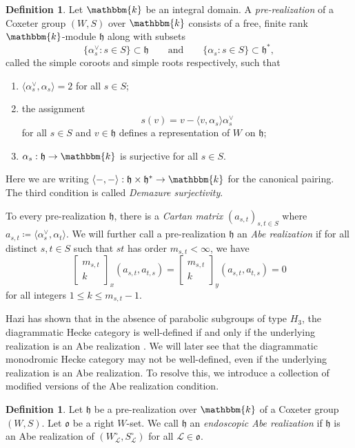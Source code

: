 \documentclass{amsart}
\renewcommand{\k}{\mathbbm{k}}
\newcommand{\scrL}{\mathcal{L}}
\newcommand{\fr}[1]{\mathfrak{#1}}
\renewcommand{\binom}[2]{\begin{bmatrix} #1 \\ #2 \end{bmatrix}}
\theoremstyle{definition}
\newtheorem{definition}[subsubsection]{Definition}
\numberwithin{equation}{subsection}
\begin{document}
\begin{definition}\label{def:realization}
    Let $\k$ be an integral domain. A \emph{pre-realization} of a Coxeter group $(W,S)$ over $\k$ consists of a free, finite rank $\k$-module $\fr{h}$ along with subsets
    \[ \{ \alpha_s^{\vee} : s \in S \} \subset \fr{h} \qquad\text{and}\qquad \{ \alpha_s : s \in S \} \subset \fr{h}^*, \]
    called the simple coroots and simple roots respectively, such that
    \begin{enumerate}
        \item $\langle \alpha_s^{\vee}, \alpha_s \rangle = 2$ for all $s \in S$;
        \item the assignment
            \[s (v) = v - \langle v, \alpha_s \rangle \alpha_s^{\vee}\]
            for all $s \in S$ and $v \in \fr{h}$ defines a representation of $W$ on $\fr{h}$;
        \item $\alpha_s : \fr{h} \to \k$ is surjective for all $s \in S$.
    \end{enumerate}
    Here we are writing $\langle -, - \rangle : \fr{h} \times \fr{h}^* \to \k$ for the canonical pairing. The third condition is called \emph{Demazure surjectivity}.

    To every pre-realization $\fr{h}$, there is a \emph{Cartan matrix} $(a_{s,t})_{s,t \in S}$ where $a_{s,t} \coloneq \langle \alpha_s^{\vee}, \alpha_t \rangle$.
    We will further call a pre-realization $\fr{h}$ an \emph{Abe realization} if for all distinct $s,t \in S$ such that $st$ has order $m_{s,t} < \infty$, we have
        \[\binom{m_{s,t}}{k}_x (a_{s,t}, a_{t,s}) = \binom{m_{s,t}}{k}_y (a_{s,t}, a_{t,s}) = 0\]
        for all integers $1 \leq k \leq m_{s,t} - 1$.
\end{definition}

Hazi has shown that in the absence of parabolic subgroups of type $H_3$, the diagrammatic Hecke category is well-defined if and only if the underlying realization is an Abe realization \cite{Hazi}.
We will later see that the diagrammatic monodromic Hecke category may not be well-defined, even if the underlying realization is an Abe realization.
To resolve this, we introduce a collection of modified versions of the Abe realization condition.

\begin{definition}\label{def:endo_abe_realization}
    Let $\fr{h}$ be a pre-realization over $\k$ of a Coxeter group $(W,S)$. Let $\fr{o}$ be a right $W$-set.
    We call $\fr{h}$ an \emph{endoscopic Abe realization} if $\fr{h}$ is an Abe realization of $(W_{\scrL}^{\circ}, S_{\scrL}^{\circ})$ for all $\scrL \in \fr{o}$.
\end{definition}
\end{document}
